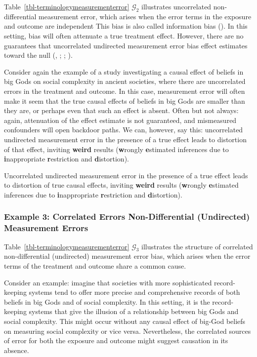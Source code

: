 \documentclass[
  single column]{article}
\begin{document}
Table~\ref{tbl-terminologymeasurementerror} \(\mathcal{G}_2\)
illustrates uncorrelated non-differential measurement error, which
arises when the error terms in the exposure and outcome are independent
This bias is also called information bias
(). In this setting,
bias will often attenuate a true treatment effect. However, there are no
guarantees that uncorrelated undirected measurement error bias effect
estimates toward the null (, ;
;
).

Consider again the example of a study investigating a causal effect of
beliefs in big Gods on social complexity in ancient societies, where
there are uncorrelated errors in the treatment and outcome. In this
case, measurement error will often make it seem that the true causal
effects of beliefs in big Gods are smaller than they are, or perhaps
even that such an effect is absent. Often but not always: again,
attenuation of the effect estimate is not guaranteed, and mismeasured
confounders will open backdoor paths. We can, however, say this:
uncorrelated undirected measurement error in the presence of a true
effect leads to distortion of that effect, inviting \textbf{weird}
results (\textbf{w}rongly \textbf{e}stimated inferences due to
\textbf{i}nappropriate \textbf{r}estriction and \textbf{d}istortion).

Uncorrelated undirected measurement error in the presence of a true
effect leads to distortion of true causal effects, inviting
\textbf{weird} results (\textbf{w}rongly \textbf{e}stimated inferences
due to \textbf{i}nappropriate \textbf{r}estriction and
\textbf{d}istortion).

\subsubsection{Example 3: Correlated Errors Non-Differential
(Undirected) Measurement
Errors}\label{example-3-correlated-errors-non-differential-undirected-measurement-errors}

Table~\ref{tbl-terminologymeasurementerror} \(\mathcal{G}_3\)
illustrates the structure of correlated non-differential (undirected)
measurement error bias, which arises when the error terms of the
treatment and outcome share a common cause.

Consider an example: imagine that societies with more sophisticated
record-keeping systems tend to offer more precise and comprehensive
records of both beliefs in big Gods and of social complexity. In this
setting, it is the record-keeping systems that give the illusion of a
relationship between big Gods and social complexity. This might occur
without any causal effect of big-God beliefs on measuring social
complexity or vice versa. Nevertheless, the correlated sources of error
for both the exposure and outcome might suggest causation in its
absence.
\end{document}
